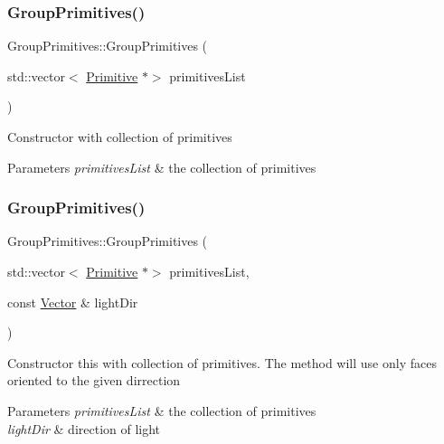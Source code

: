 \subsubsection{\texorpdfstring{Group\+Primitives()}{GroupPrimitives()}\hspace{0.1cm}{\footnotesize\ttfamily [1/2]}}
{\footnotesize\ttfamily Group\+Primitives\+::\+Group\+Primitives (\begin{DoxyParamCaption}\item[{std\+::vector$<$ \mbox{\hyperlink{class_primitive}{Primitive}} $\ast$$>$}]{primitives\+List }\end{DoxyParamCaption})\hspace{0.3cm}{\ttfamily [inline]}}

Constructor with collection of primitives 
\begin{DoxyParams}{Parameters}
{\em primitives\+List} & the collection of primitives \\
\hline
\end{DoxyParams}
\mbox{\label{class_group_primitives_a821c2b3b8a794ad486e518e313403e8f}} 
\subsubsection{\texorpdfstring{Group\+Primitives()}{GroupPrimitives()}\hspace{0.1cm}{\footnotesize\ttfamily [2/2]}}
{\footnotesize\ttfamily Group\+Primitives\+::\+Group\+Primitives (\begin{DoxyParamCaption}\item[{std\+::vector$<$ \mbox{\hyperlink{class_primitive}{Primitive}} $\ast$$>$}]{primitives\+List,  }\item[{const \mbox{\hyperlink{struct_vector}{Vector}} \&}]{light\+Dir }\end{DoxyParamCaption})\hspace{0.3cm}{\ttfamily [inline]}}

Constructor this with collection of primitives. The method will use only faces oriented to the given dirrection 
\begin{DoxyParams}{Parameters}
{\em primitives\+List} & the collection of primitives \\
\hline
{\em light\+Dir} & direction of light \\
\hline
\end{DoxyParams}


